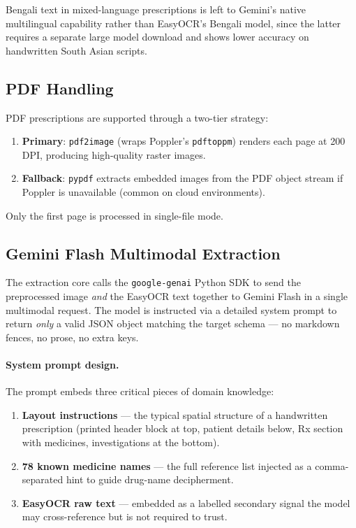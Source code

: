 \documentclass[12pt,a4paper]{article}
\begin{document}
Bengali text in mixed-language prescriptions is left to Gemini's native multilingual
capability rather than EasyOCR's Bengali model, since the latter requires a separate
large model download and shows lower accuracy on handwritten South Asian scripts.

\subsection{PDF Handling}

PDF prescriptions are supported through a two-tier strategy:

\begin{enumerate}[noitemsep]
    \item \textbf{Primary}: \texttt{pdf2image} (wraps Poppler's \texttt{pdftoppm})
          renders each page at 200 DPI, producing high-quality raster images.
    \item \textbf{Fallback}: \texttt{pypdf} extracts embedded images from the PDF
          object stream if Poppler is unavailable (common on cloud environments).
\end{enumerate}

Only the first page is processed in single-file mode.

\subsection{Gemini Flash Multimodal Extraction}

The extraction core calls the \texttt{google-genai} Python SDK to send the
preprocessed image \emph{and} the EasyOCR text together to Gemini Flash in a single
multimodal request. The model is instructed via a detailed system prompt to return
\emph{only} a valid JSON object matching the target schema — no markdown fences,
no prose, no extra keys.

\paragraph{System prompt design.}
The prompt embeds three critical pieces of domain knowledge:

\begin{enumerate}[noitemsep]
    \item \textbf{Layout instructions} — the typical spatial structure of a
      handwritten prescription (printed header block at top, patient details
          below, Rx section with medicines, investigations at the bottom).
      \item \textbf{78 known medicine names} — the full reference list injected
          as a comma-separated hint to guide drug-name decipherment.
    \item \textbf{EasyOCR raw text} — embedded as a labelled secondary signal
          the model may cross-reference but is not required to trust.
\end{enumerate}
\end{document}
